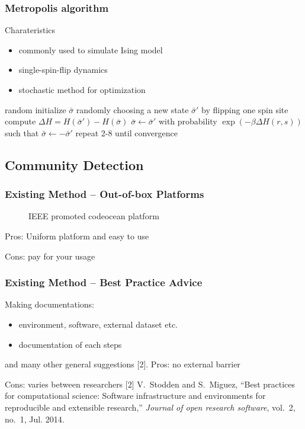 \documentclass[notheorems]{beamer}
\begin{document}
\begin{frame}
\frametitle{Metropolis algorithm}
\begin{block}{Charateristics}
\begin{itemize}
	\item commonly used to simulate Ising model
	\item single-spin-flip dynamics 
	\item stochastic method for optimization
\end{itemize}
\end{block}
	\begin{algorithmic}[1]
	\STATE random initialize $\bar{\sigma}$
	\STATE randomly choosing a new state $\bar{\sigma}'$ by flipping one spin site
	\STATE compute $\Delta H= H(\bar{\sigma}') - H(\bar{\sigma})$
	\STATE $\bar{\sigma} \leftarrow \bar{\sigma}'$
	\ELSE
	\STATE with probability $\exp(-\beta \Delta H(r,s))$ 
	such that $\bar{\sigma} \leftarrow -\bar{\sigma}'$ 
	\ENDIF
	\STATE repeat 2-8 until convergence
\end{algorithmic}
\end{frame}

\begin{frame}
\subsection{Community Detection}
\frametitle{Existing Method -- Out-of-box Platforms}

\begin{figure}
\caption{IEEE promoted codeocean platform}
\end{figure}
Pros: Uniform platform and easy to use

Cons: pay for your usage
\end{frame}

\begin{frame}
\frametitle{Existing Method -- Best Practice Advice}

Making documentations:
\begin{itemize}
\item environment, software, external dataset etc.
\item documentation of each steps
\end{itemize}
and many other general suggestions [2].
\vskip 0.5cm
Pros: no external barrier

Cons: varies between researchers
\vskip 1cm
{\tiny
[2] V.~Stodden and S.~Miguez, ``Best practices for computational science: Software
  infrastructure and environments for reproducible and extensible research,''
  \emph{Journal of open research software}, vol.~2, no.~1, Jul. 2014.
  }
\end{frame}
\end{document}

